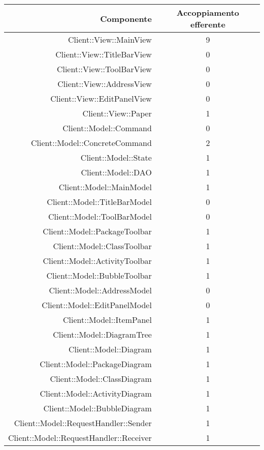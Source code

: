\documentclass[../PianoDiQualifica.tex]{subfiles}
\begin{document}
			\begin{longtable}{|r|c|}
				\hline
				\rowcolor{blue!30}\textbf{Componente} & \textbf{Accoppiamento efferente} \\
				\hline
				\endhead
				Client::View::MainView & 9 \\ \hline
				Client::View::TitleBarView & 0 \\ \hline
				Client::View::ToolBarView & 0 \\ \hline
				Client::View::AddressView & 0 \\ \hline
				Client::View::EditPanelView & 0 \\ \hline
				Client::View::Paper & 1 \\ \hline
				Client::Model::Command & 0\\ \hline
				Client::Model::ConcreteCommand & 2 \\ \hline
				Client::Model::State & 1 \\ \hline
				Client::Model::DAO & 1 \\ \hline
				Client::Model::MainModel & 1 \\ \hline
				Client::Model::TitleBarModel & 0 \\ \hline
				Client::Model::ToolBarModel & 0 \\ \hline
				Client::Model::PackageToolbar & 1 \\ \hline
				Client::Model::ClassToolbar & 1 \\ \hline
				Client::Model::ActivityToolbar & 1 \\ \hline
				Client::Model::BubbleToolbar & 1 \\ \hline
				Client::Model::AddressModel & 0 \\ \hline
				Client::Model::EditPanelModel & 0 \\ \hline
				Client::Model::ItemPanel & 1 \\ \hline
				Client::Model::DiagramTree & 1 \\ \hline
				Client::Model::Diagram & 1 \\ \hline
				Client::Model::PackageDiagram & 1 \\ \hline
				Client::Model::ClassDiagram & 1 \\ \hline
				Client::Model::ActivityDiagram & 1 \\ \hline
				Client::Model::BubbleDiagram & 1 \\ \hline
				Client::Model::RequestHandler::Sender & 1 \\ \hline
				Client::Model::RequestHandler::Receiver & 1 \\ \hline

\end{longtable}
\end{document}
